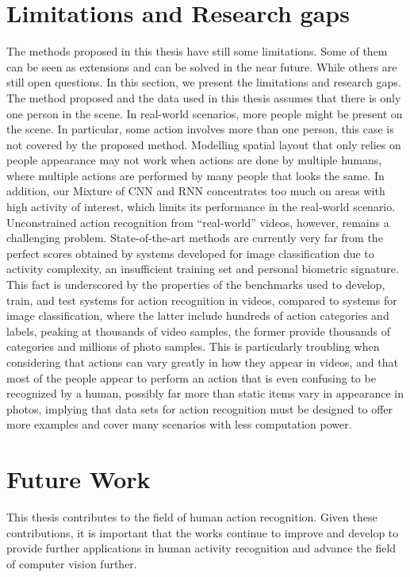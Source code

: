 \section{Limitations and Research gaps}
The methods proposed in this thesis have still some limitations. Some of them can be seen
as extensions and can be solved in the near future. While others are still open questions. In this section, we present the limitations and research gaps.\\

The method proposed and the data used in this thesis assumes that there is only one person in the scene. In real-world scenarios, more people might be present on the scene. In particular, some action involves more than one person,  this case is not covered by the proposed method. Modelling spatial layout that only relies on people appearance may not work when actions are done by multiple humans, where multiple actions are performed by many people that looks the same. In addition, our Mixture of CNN and RNN concentrates too much on areas with high activity of interest, which limits its performance in the real-world scenario.\\

Unconstrained action recognition from “real-world” videos,
however, remains a challenging problem. State-of-the-art
methods are currently very far from the perfect scores obtained by systems developed for image classification due to activity complexity, an insufficient training set and personal biometric signature. This fact is underscored by the properties of the benchmarks
used to develop, train, and test systems for action recognition in videos, compared to systems for image classification, where the latter include hundreds of action categories and labels,
peaking at thousands of video samples, the former provide
thousands of categories and millions of photo samples. This
is particularly troubling when considering that actions can
vary greatly in how they appear in videos, and that most of the people appear to perform an action that is even confusing to be recognized by a human, possibly far more
than static items vary in appearance in photos, implying that
data sets for action recognition must be designed to offer
more examples and cover many scenarios with less computation power.

\section{Future Work}
This thesis contributes to the field of human action recognition. Given these contributions, it is important that the works continue to improve and develop to provide further applications in human activity recognition and advance the field of computer vision further.\\

